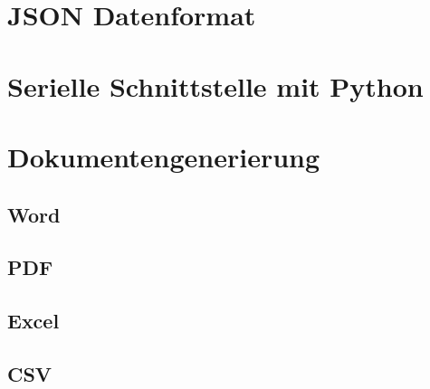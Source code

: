 \section{JSON Datenformat}

\section{Serielle Schnittstelle mit Python}

\section{Dokumentengenerierung}

\subsection{Word}

\subsection{PDF}

\subsection{Excel}

\subsection{CSV}